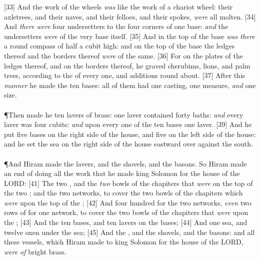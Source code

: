 [33] \textcolor[cmyk]{0.99998,1,0,0}{And the work of the wheels \emph{was} like the work of a chariot wheel: their axletrees, and their naves, and their felloes, and their spokes, \emph{were} all molten.}
[34] \textcolor[cmyk]{0.99998,1,0,0}{And \emph{there} \emph{were} four undersetters to the four corners of one base: \emph{and} the undersetters \emph{were} of the very base itself.}
[35] \textcolor[cmyk]{0.99998,1,0,0}{And in the top of the base \emph{was} \emph{there} a round compass of half a cubit high: and on the top of the base the ledges thereof and the borders thereof \emph{were} of the same.}
[36] \textcolor[cmyk]{0.99998,1,0,0}{For on the plates of the ledges thereof, and on the borders thereof, he graved cherubims, lions, and palm trees, according to the  of every one, and additions round about.}
[37] \textcolor[cmyk]{0.99998,1,0,0}{After this \emph{manner} he made the ten bases: all of them had one casting, one measure, \emph{and} one size.}\\
\\
\P \textcolor[cmyk]{0.99998,1,0,0}{Then made he ten lavers of brass: one laver contained forty baths: \emph{and} every laver was four cubits: \emph{and} upon every one of the ten bases one laver.}
[39] \textcolor[cmyk]{0.99998,1,0,0}{And he put five bases on the right side of the house, and five on the left side of the house: and he set the sea on the right side of the house eastward over against the south.}\\
\\
\P \textcolor[cmyk]{0.99998,1,0,0}{And Hiram made the lavers, and the shovels, and the basons. So Hiram made an end of doing all the work that he made king Solomon for the house of the LORD:}
[41] \textcolor[cmyk]{0.99998,1,0,0}{The two , and the \emph{two} bowls of the chapiters that \emph{were} on the top of the two ; and the two networks, to cover the two bowls of the chapiters which \emph{were} upon the top of the ;}
[42] \textcolor[cmyk]{0.99998,1,0,0}{And four hundred  for the two networks, \emph{even} two rows of  for one network, to cover the two bowls of the chapiters that \emph{were} upon the ;}
[43] \textcolor[cmyk]{0.99998,1,0,0}{And the ten bases, and ten lavers on the bases;}
[44] \textcolor[cmyk]{0.99998,1,0,0}{And one sea, and twelve oxen under the sea;}
[45] \textcolor[cmyk]{0.99998,1,0,0}{And the , and the shovels, and the basons: and all these vessels, which Hiram made to king Solomon for the house of the LORD, \emph{were} \emph{of} bright brass.}
